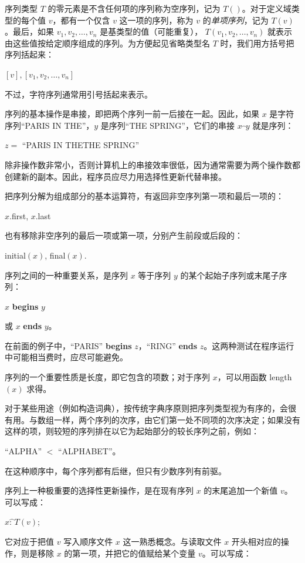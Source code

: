序列类型 $T$ 的零元素是不含任何项的序列\textemdash{}称为空序列，记为 $T()$。对于定义域类型的每个值 $v$，都有一个仅含 $v$ 这一项的序列，称为 $v$ 的\textit{单项序列}，记为 $T(v)$。最后，如果 $v_1, v_2, \dots, v_n$ 是基类型的值（可能重复），
$T(v_1, v_2, \dots, v_n)$ 就表示由这些值按给定顺序组成的序列。为方便起见省略类型名 $T$ 时，我们用方括号把序列括起来：

\quad $[v],$\qquad $[v_1, v_2, \dots, v_n]$

\noindent
不过，字符序列通常用引号括起来表示。

序列的基本操作是串接，即把两个序列一前一后接在一起。因此，如果 $x$ 是字符序列“PARIS IN THE”，$y$ 是序列“THE SPRING”，它们的串接 $x\wideparen{\ \ }y$ 就是序列：

\quad $z =$ ``PARIS IN THETHE SPRING''

\noindent
除非操作数非常小，否则计算机上的串接效率很低，因为通常需要为两个操作数都创建新的副本。因此，程序员应尽力用选择性更新代替串接。

把序列分解为组成部分的基本运算符，有返回非空序列第一项和最后一项的：

\quad $x$.first, $x$.last

\noindent
也有移除非空序列的最后一项或第一项，分别产生前段或后段的：

\quad initial$(x)$, final$(x)$.

序列之间的一种重要关系，是序列 $x$ 等于序列 $y$ 的某个起始子序列或末尾子序列：

\quad $x$ \textbf{begins} $y$

\quad 或 $x$ \textbf{ends} $y$。

\noindent
在前面的例子中，“PARIS” \textbf{begins} $z$，“RING” \textbf{ends} $z$。这两种测试在程序运行中可能相当费时，应尽可能避免。

序列的一个重要性质是长度，即它包含的项数；对于序列 $x$，可以用函数 length$(x)$ 求得。

对于某些用途（例如构造词典），按传统字典序原则把序列类型视为有序的，会很有用。与数组一样，两个序列的次序，由它们第一处不同项的次序决定；如果没有这样的项，则较短的序列排在以它为起始部分的较长序列之前，例如：

\quad ``ALPHA'' $<$ ``ALPHABET''。

\noindent
在这种顺序中，每个序列都有后继，但只有少数序列有前驱。

序列上一种极重要的选择性更新操作，是在现有序列 $x$ 的末尾追加一个新值 $v$。可以写成：


\quad $x\wideparen{\text{: \ } }T(v)$;

\noindent
它对应于把值 $v$ 写入顺序文件 $x$ 这一熟悉概念。与读取文件 $x$ 开头相对应的操作，则是移除 $x$ 的第一项，并把它的值赋给某个变量 $v$。可以写成：

